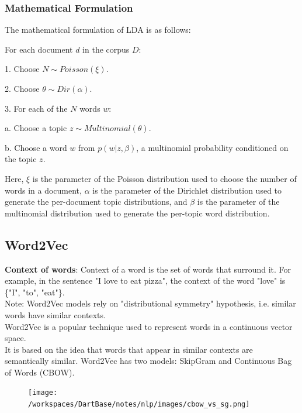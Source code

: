\documentclass[12pt]{article}
\begin{document}
        \subsubsection{Mathematical Formulation}

            The mathematical formulation of LDA is as follows:
            
            For each document $d$ in the corpus $D$:
            
            1. Choose $N \sim Poisson(\xi)$.
            
            2. Choose $\theta \sim Dir(\alpha)$.
            
            3. For each of the $N$ words $w$:
            
                a. Choose a topic $z \sim Multinomial(\theta)$.
            
                b. Choose a word $w$ from $p(w|z,\beta)$, a multinomial probability conditioned on the topic $z$.
            
            Here, $\xi$ is the parameter of the Poisson distribution used to choose the number of words in a document, $\alpha$ is the parameter of the Dirichlet distribution used to generate the per-document topic distributions, and $\beta$ is the parameter of the multinomial distribution used to generate the per-topic word distribution.
        

    \subsection{Word2Vec}
        \textbf{Context of words}: Context of a word is the set of words that surround it.
        For example, in the sentence "I love to eat pizza", the context of the word "love" is \{"I", "to", "eat"\}.
        \\
        Note: Word2Vec models rely on "distributional symmetry" hypothesis, i.e. similar words have similar contexts.
        \\
        Word2Vec is a popular technique used to represent words in a continuous vector space. \\
        It is based on the idea that words that appear in similar contexts are semantically similar.
        Word2Vec has two models: SkipGram and Continuous Bag of Words (CBOW).
        \begin{figure}[h]
            \centering
            \texttt{[image: /workspaces/DartBase/notes/nlp/images/cbow\_vs\_sg.png]}
        \end{figure}
\end{document}
